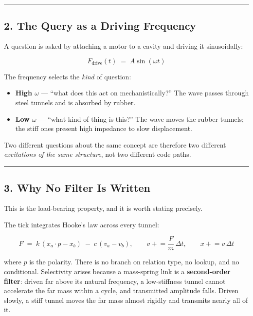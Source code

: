 \documentclass[
  11pt,
  a4paper,
]{article}
\providecommand{\tightlist}{%
  \setlength{\itemsep}{0pt}\setlength{\parskip}{0pt}}
\begin{document}
\begin{center}\rule{0.5\linewidth}{0.5pt}\end{center}

\subsection{2. The Query as a Driving
Frequency}\label{the-query-as-a-driving-frequency}

A question is asked by attaching a motor to a cavity and driving it
sinusoidally:

\[
F_{\text{drive}}(t) \;=\; A \sin(\omega t)
\]

The frequency selects the \emph{kind} of question:

\begin{itemize}
\tightlist
\item
  \textbf{High \(\omega\)} --- ``what does this act on
  mechanistically?'' The wave passes through steel tunnels and is
  absorbed by rubber.
\item
  \textbf{Low \(\omega\)} --- ``what kind of thing is this?'' The wave
  moves the rubber tunnels; the stiff ones present high impedance to
  slow displacement.
\end{itemize}

Two different questions about the same concept are therefore two
different \emph{excitations of the same structure}, not two different
code paths.

\begin{center}\rule{0.5\linewidth}{0.5pt}\end{center}

\subsection{3. Why No Filter Is Written}\label{why-no-filter-is-written}

This is the load-bearing property, and it is worth stating precisely.

The tick integrates Hooke's law across every tunnel:

\[
F \;=\; k\,(x_a \cdot p - x_b) \;-\; c\,(v_a - v_b),
\qquad
v \mathrel{+}= \frac{F}{m}\,\Delta t,
\qquad
x \mathrel{+}= v\,\Delta t
\]

where \(p\) is the polarity. There is no branch on relation type, no
lookup, and no conditional. Selectivity arises because a mass-spring
link is a \textbf{second-order filter}: driven far above its natural
frequency, a low-stiffness tunnel cannot accelerate the far mass within
a cycle, and transmitted amplitude falls. Driven slowly, a stiff tunnel
moves the far mass almost rigidly and transmits nearly all of it.
\end{document}
